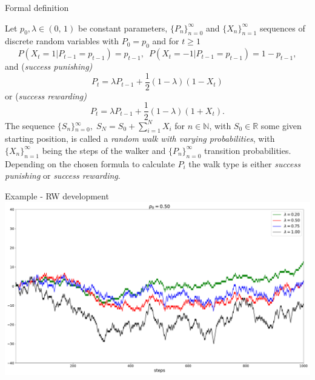 \documentclass[american]{beamer}
\begin{document}
    \begin{frame}{Formal definition}
        \begin{definition}
            Let $\ensuremath{p_{0},\lambda\in(0,\,1)}$\textrm{ be constant parameters,
                ${\{P_{n}\}}_{n=0}^{\infty}$ and ${\{X_{n}\}}_{n=1}^{\infty}$ sequences
                of discrete random variables with $P_{0}=p_{0}$ and for $t\ge1$
                \[
                    P(X_{t}=1|P_{t-1}=p_{t-1})=p_{t-1},\,\,\,P(X_{t}=-1|P_{t-1}=p_{t-1})=1-p_{t-1},
                \]
                and (}\emph{success punishing)}\textrm{
                \[
                    P_{t}=\lambda P_{t-1}+\frac{1}{2}(1-\lambda)(1-X_{t})
                \]
                or (}\emph{success rewarding)
                \[
                    P_{t}=\lambda P_{t-1}+\frac{1}{2}(1-\lambda)(1+X_{t}).
                \]
            }The sequence ${\{S_{n}\}}{}_{n=0}^{\infty},\;S_{N}=S_{0}+\sum_{i=1}^{N}X_{i}$
            for $n\in\mathbb{N}$, with $S_{0}\in\mathbb{R}$ some given starting
            position, is called a \emph{random walk with varying probabilities},
            with ${\{X_{n}\}}_{n=1}^{\infty}$ being the steps of the walker and
            ${\{P_{n}\}}_{n=0}^{\infty}$ transition probabilities.
            Depending
            on the chosen formula to calculate $P_{i}$ the walk type is either
            \emph{success punishing} or \emph{success rewarding}.
        \end{definition}

    \end{frame}

    \begin{frame}{Example - RW development}
        \includegraphics[width=1\textwidth]{../../simulations/single_walk_1000_steps_type_success_punished}
    \end{frame}
\end{document}
